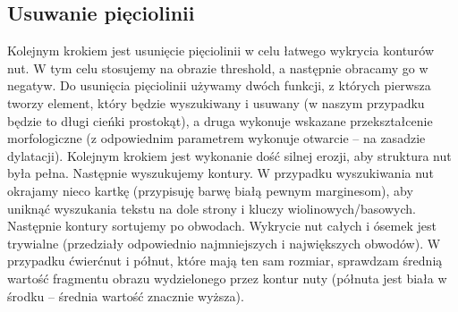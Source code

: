 \documentclass[11pt]{article}
\begin{document}
\subsection{Usuwanie pięciolinii}
Kolejnym krokiem jest usunięcie pięciolinii w celu łatwego wykrycia konturów nut.
W tym celu stosujemy na obrazie threshold, a następnie obracamy go w negatyw.
Do usunięcia pięciolinii używamy dwóch funkcji, 
z których pierwsza tworzy element, który będzie wyszukiwany i usuwany (w naszym przypadku będzie to długi cieńki prostokąt), 
a druga wykonuje wskazane przekształcenie morfologiczne (z odpowiednim parametrem wykonuje otwarcie -- na zasadzie dylatacji).
Kolejnym krokiem jest wykonanie dość silnej erozji, aby struktura nut była pełna.
Następnie wyszukujemy kontury.
W przypadku wyszukiwania nut okrajamy nieco kartkę (przypisuję barwę białą pewnym marginesom),
aby uniknąć wyszukania tekstu na dole strony i kluczy wiolinowych/basowych.
Następnie kontury sortujemy po obwodach.
Wykrycie nut całych i ósemek jest trywialne (przedziały odpowiednio najmniejszych i największych obwodów).
W przypadku ćwierćnut i półnut, które mają ten sam rozmiar, sprawdzam średnią wartość fragmentu obrazu wydzielonego
przez kontur nuty (półnuta jest biała w środku -- średnia wartość znacznie wyższa).
\newline
\end{document}
